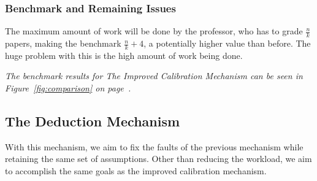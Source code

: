 \documentclass[12pt, Arial]{article}
\begin{document}
\subsubsection{Benchmark and Remaining Issues}
The maximum amount of work will be done by the professor, who has to grade $\frac{n}{k}$ papers, making the benchmark $\frac{n}{k}+4$, a potentially higher value than before. The huge problem with this is the high amount of work being done.

\emph{The benchmark results for The Improved Calibration Mechanism can be seen in Figure~\ref{fig:comparison} on page~\pageref{fig:comparison}.}

\subsection{The Deduction Mechanism}
\label{sec:deduction}
With this mechanism, we aim to fix the faults of the previous mechanism while retaining the same set of assumptions. Other than reducing the workload, we aim to accomplish the same goals as the improved calibration mechanism.
\end{document}
